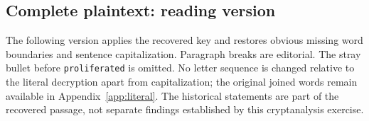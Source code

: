 \subsection{Complete plaintext: reading version}
\label{sec:plaintext}
The following version applies the recovered key and restores obvious missing word boundaries and sentence capitalization. Paragraph breaks are editorial. The stray bullet before \texttt{proliferated} is omitted. No letter sequence is changed relative to the literal decryption apart from capitalization; the original joined words remain available in Appendix~\ref{app:literal}. The historical statements are part of the recovered passage, not separate findings established by this cryptanalysis exercise.


